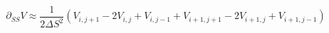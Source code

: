 \begin{equation}\label{second_wrt_S}
	\partial_{SS} V	\approx \frac{1}{2\Delta S^2}\left(V_{i,j+1} - 2V_{i,j } + V_{i,j-1}+ V_{i+1,j+1}-2V_{i+1,j} + V_{i+1,j-1}\right)
\end{equation}